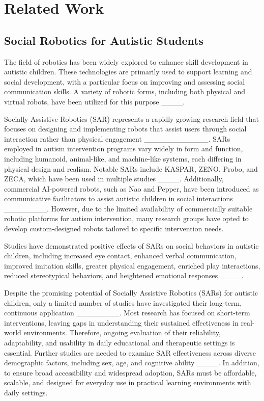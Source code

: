 \section{Related Work}
\subsection{Social Robotics for Autistic Students} %

The field of robotics has been widely explored to enhance skill development in autistic children. These technologies are primarily used to support learning and social development, with a particular focus on improving and assessing social communication skills. A variety of robotic forms, including both physical and virtual robots, have been utilized for this purpose ____.

Socially Assistive Robotics (SAR) represents a rapidly growing research field that focuses on designing and implementing robots that assist users through social interaction rather than physical engagement ____________. SARs employed in autism intervention programs vary widely in form and function, including humanoid, animal-like, and machine-like systems, each differing in physical design and realism. Notable SARs include KASPAR, ZENO, Probo, and ZECA, which have been used in multiple studies ____. Additionally, commercial AI-powered robots, such as Nao and Pepper, have been introduced as communicative facilitators to assist autistic children in social interactions ________. However, due to the limited availability of commercially suitable robotic platforms for autism intervention, many research groups have opted to develop custom-designed robots tailored to specific intervention needs. 

Studies have demonstrated positive effects of SARs on social behaviors in autistic children, including increased eye contact, enhanced verbal communication, improved imitation skills, greater physical engagement, enriched play interactions, reduced stereotypical behaviors, and heightened emotional responses ____.

Despite the promising potential of Socially Assistive Robotics (SARs) for autistic children, only a limited number of studies have investigated their long-term, continuous application ________. Most research has focused on short-term interventions, leaving gaps in understanding their sustained effectiveness in real-world environments. Therefore, ongoing evaluation of their reliability, adaptability, and usability in daily educational and therapeutic settings is essential. Further studies are needed to examine SAR effectiveness across diverse demographic factors, including sex, age, and cognitive ability ____. In addition, to ensure broad accessibility and widespread adoption, SARs must be affordable, scalable, and designed for everyday use in practical learning environments with daily settings. 

